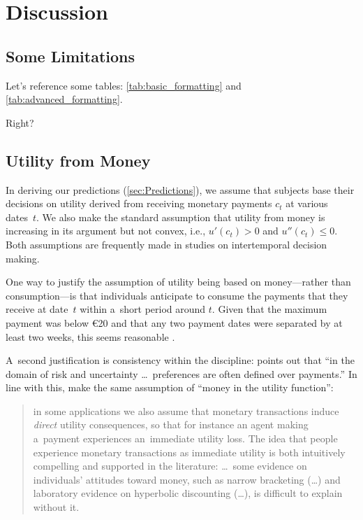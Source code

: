 

\section{Discussion}
\label{sec:Discussion}

\blindmathfalse
\subsection{Some Limitations}
\label{sec:discussion:inspection_costs}

Let's reference some tables: \autoref{tab:basic_formatting} and \autoref{tab:advanced_formatting}. \Blindtext[3]



\blindtext Right?

\subsection{Utility from Money}
\label{sec:discussion:utility_from_money}

In deriving our predictions (\autoref{sec:Predictions}), we assume that subjects base their decisions on utility derived from receiving monetary payments $c_t$ at various dates~$t$. We also make the standard assumption that utility from money is increasing in its argument but not convex, i.e., ${u'(c_t) > 0}$ and ${u''(c_t) \le 0}$. Both assumptions are frequently made in studies on intertemporal decision making.

One way to justify the assumption of utility being based on money---rather than consumption---is that individuals anticipate to consume the payments that they receive at date~$t$ within a~short period around $t$. Given that the maximum payment was below \euro 20 and that any two payment dates were separated by at least two weeks, this seems reasonable \citep[see the arguments in favor of this view in][]{Halevy2014}.

A~second justification is consistency within the discipline: \cite{Halevy2014} points out that ``in the domain of risk and uncertainty \dots\ preferences are often defined over payments.'' In line with this,
\cite[p.\,62]{Koszegi2013} make the same assumption of ``money in the utility function'':

\begin{quotation}
in some applications we also assume that monetary transactions induce \emph{direct} utility consequences, so that for instance an agent making a~payment experiences an~immediate utility loss. The idea that people experience monetary transactions as immediate utility is both intuitively compelling and supported in the literature: \dots\ some evidence on individuals' attitudes toward money, such as narrow bracketing (\dots) and laboratory evidence on hyperbolic discounting (\dots), is difficult to explain without it.
\end{quotation}

